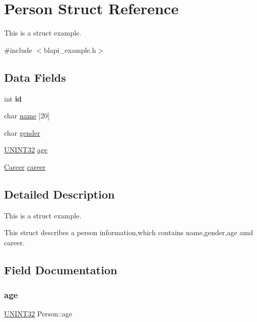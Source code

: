 \hypertarget{structPerson}{}\section{Person Struct Reference}
\label{structPerson}


This is a struct example.  




{\ttfamily \#include $<$blapi\+\_\+example.\+h$>$}

\subsection*{Data Fields}
\begin{DoxyCompactItemize}
\item 
\mbox{\label{structPerson_aec48a92f614a854ff380a15eb8e2f479}} 
int {\bfseries id}
\item 
char \hyperlink{structPerson_ad6b4ae900027c222f1ed47650f0d76a2}{name} \mbox{[}20\mbox{]}
\item 
char \hyperlink{structPerson_aadbaa9e7532dcc90a2734868347b59d3}{gender}
\item 
\hyperlink{blapi__example_8h_a8b8e91f72a804d8f6a9604b278695545}{U\+N\+I\+N\+T32} \hyperlink{structPerson_a46f0457f64eccd56892ffa899c226c9e}{age}
\item 
\hyperlink{blapi__example_8h_a62cd6422824fadbc39768970839e09a5}{Career} \hyperlink{structPerson_a6d70e8d878191108816fe330114af6a6}{career}
\end{DoxyCompactItemize}


\subsection{Detailed Description}
This is a struct example. 

This struct describes a person information,which contains name,gender,age amd career. 

\subsection{Field Documentation}
\mbox{\label{structPerson_a46f0457f64eccd56892ffa899c226c9e}} 
\subsubsection{\texorpdfstring{age}{age}}
{\footnotesize\ttfamily \hyperlink{blapi__example_8h_a8b8e91f72a804d8f6a9604b278695545}{U\+N\+I\+N\+T32} Person\+::age}

